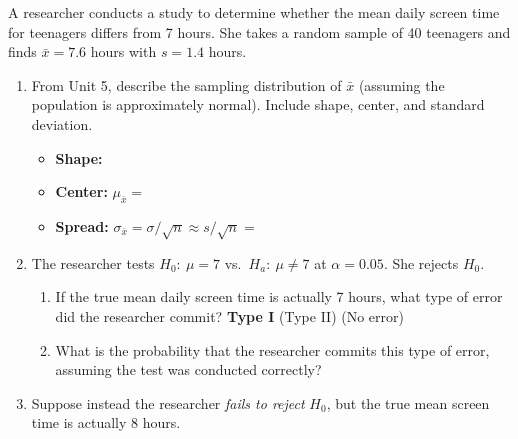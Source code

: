 \documentclass[10pt]{article}
\begin{document}
\namedateperiod

\vspace{0.15in}

A researcher conducts a study to determine whether the mean daily screen time for
teenagers differs from 7 hours. She takes a random sample of 40 teenagers and finds
$\bar x = 7.6$ hours with $s = 1.4$ hours.

\begin{enumerate}
  \item From Unit 5, describe the sampling distribution of $\bar x$ (assuming the
        population is approximately normal). Include shape, center, and standard deviation.

        \begin{itemize}
          \item \textbf{Shape:} 
          \item \textbf{Center:} $\mu_{\bar x} = $ 
          \item \textbf{Spread:} $\sigma_{\bar x} = \sigma/\sqrt{n} \approx s/\sqrt{n} = $
        \end{itemize}

        \vspace{0.05in}

  \item The researcher tests $H_0{:}\ \mu = 7$ vs.\ $H_a{:}\ \mu \ne 7$ at $\alpha = 0.05$.
        She rejects $H_0$.

        \begin{enumerate}[label=\alph*.]
          \item If the true mean daily screen time is actually 7 hours, what type of
                error did the researcher commit? \quad
                \textcolor{keyred}{\textbf{Type I}} \quad (Type II) \quad (No error)

                \vspace{0.05in}
          \item What is the probability that the researcher commits this type of error,
                assuming the test was conducted correctly?
        \end{enumerate}

        \vspace{0.05in}

  \item Suppose instead the researcher \emph{fails to reject} $H_0$, but the true
        mean screen time is actually 8 hours.


\end{enumerate}
\end{document}
